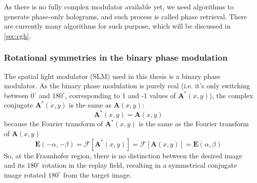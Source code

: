 As there is no fully complex modulator available yet, we need algorithms to generate phase-only holograms, and such process is called phase retrieval. There are currently many algorithms for such purpose, which will be discussed in \cref{sec:cgh}.

\subsubsection{Rotational symmetries in the binary phase modulation} \label{sec:Rotational symmetries in the binary phase modulation}

The spatial light modulator (SLM) used in this thesis is a binary phase modulator. As the binary phase modulation is purely real (i.e. it's only switching between $0^\circ$ and $180^\circ$, corresponding to 1 and -1 values of $\textbf{A}^*(x,y)$), the complex conjugate $\textbf{A}^*(x,y)$ is the same as $\textbf{A}(x,y)$:
\begin{equation} \label{eq:AequalsAstar}
  \textbf{A}^*(x,y) = \textbf{A}(x,y)
\end{equation}
because the Fourier transform of $\textbf{A}^*(x,y)$ is the same as the Fourier transform of $\textbf{A}(x,y)$
\begin{equation} \label{eq:AAstar}
  \textbf{E}(-\alpha, -\beta)=\mathcal{F}[\textbf{A}^*(x,y)]=\mathcal{F}[\textbf{A}(x,y)]=\textbf{E}(\alpha, \beta)
\end{equation}
So, at the Fraunhofer region, there is no distinction between the desired image and its $180^\circ$ rotation in the replay field, resulting in a symmetrical conjugate image rotated $180^\circ$ from the target image.

